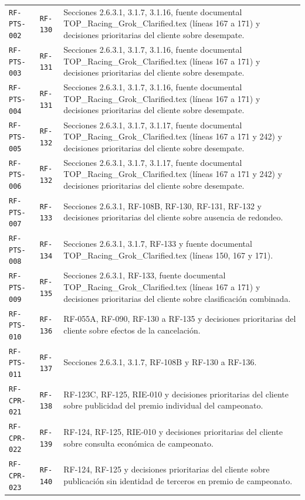 \documentclass[10pt,letterpaper]{article}
\begin{document}
\begin{landscape}
\begin{longtable}{P{2.7cm}P{2.6cm}P{15.7cm}}
\texttt{RF-PTS-002} & \texttt{RF-130} & Secciones 2.6.3.1, 3.1.7, 3.1.16, fuente documental TOP\_Racing\_Grok\_Clarified.tex (líneas 167 a 171) y decisiones prioritarias del cliente sobre desempate.\\
\texttt{RF-PTS-003} & \texttt{RF-131} & Secciones 2.6.3.1, 3.1.7, 3.1.16, fuente documental TOP\_Racing\_Grok\_Clarified.tex (líneas 167 a 171) y decisiones prioritarias del cliente sobre desempate.\\
\texttt{RF-PTS-004} & \texttt{RF-131} & Secciones 2.6.3.1, 3.1.7, 3.1.16, fuente documental TOP\_Racing\_Grok\_Clarified.tex (líneas 167 a 171) y decisiones prioritarias del cliente sobre desempate.\\
\texttt{RF-PTS-005} & \texttt{RF-132} & Secciones 2.6.3.1, 3.1.7, 3.1.17, fuente documental TOP\_Racing\_Grok\_Clarified.tex (líneas 167 a 171 y 242) y decisiones prioritarias del cliente sobre desempate.\\
\texttt{RF-PTS-006} & \texttt{RF-132} & Secciones 2.6.3.1, 3.1.7, 3.1.17, fuente documental TOP\_Racing\_Grok\_Clarified.tex (líneas 167 a 171 y 242) y decisiones prioritarias del cliente sobre desempate.\\
\texttt{RF-PTS-007} & \texttt{RF-133} & Secciones 2.6.3.1, RF-108B, RF-130, RF-131, RF-132 y decisiones prioritarias del cliente sobre ausencia de redondeo.\\
\texttt{RF-PTS-008} & \texttt{RF-134} & Secciones 2.6.3.1, 3.1.7, RF-133 y fuente documental TOP\_Racing\_Grok\_Clarified.tex (líneas 150, 167 y 171).\\
\texttt{RF-PTS-009} & \texttt{RF-135} & Secciones 2.6.3.1, RF-133, fuente documental TOP\_Racing\_Grok\_Clarified.tex (líneas 167 a 171) y decisiones prioritarias del cliente sobre clasificación combinada.\\
\texttt{RF-PTS-010} & \texttt{RF-136} & RF-055A, RF-090, RF-130 a RF-135 y decisiones prioritarias del cliente sobre efectos de la cancelación.\\
\texttt{RF-PTS-011} & \texttt{RF-137} & Secciones 2.6.3.1, 3.1.7, RF-108B y RF-130 a RF-136.\\
\texttt{RF-CPR-021} & \texttt{RF-138} & RF-123C, RF-125, RIE-010 y decisiones prioritarias del cliente sobre publicidad del premio individual del campeonato.\\
\texttt{RF-CPR-022} & \texttt{RF-139} & RF-124, RF-125, RIE-010 y decisiones prioritarias del cliente sobre consulta económica de campeonato.\\
\texttt{RF-CPR-023} & \texttt{RF-140} & RF-124, RF-125 y decisiones prioritarias del cliente sobre publicación sin identidad de terceros en premio de campeonato.\\

\end{longtable}
\end{landscape}
\end{document}
